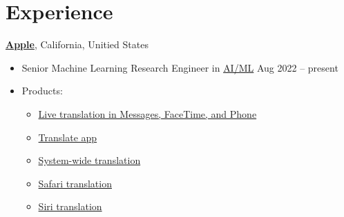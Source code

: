 
\section{\sc Experience}

{\bf \href{https://www.apple.com}{Apple}}, California, Unitied States
\begin{itemize}
    \item[] Senior Machine Learning Research Engineer in \href{https://machinelearning.apple.com}{AI/ML} \hfill Aug 2022 -- present
    \item[] Products:
        \begin{itemize}
            \item \href{https://www.apple.com/newsroom/2025/06/apple-intelligence-gets-even-more-powerful-with-new-capabilities-across-apple-devices/}{Live translation in Messages, FaceTime, and Phone}
            \item \href{https://support.apple.com/guide/iphone/translate-text-voice-and-conversations-iphd74cb450f/ios}{Translate app}
            \item \href{https://support.apple.com/en-in/guide/iphone/iphab4dcff1d/ios}{System-wide translation}
            \item \href{https://support.apple.com/guide/iphone/browse-the-web-iph1fbef4daa/ios}{Safari translation}
            \item \href{https://support.apple.com/en-in/guide/iphone/iph83aad8922/ios}{Siri translation}
        \end{itemize}
\end{itemize}

